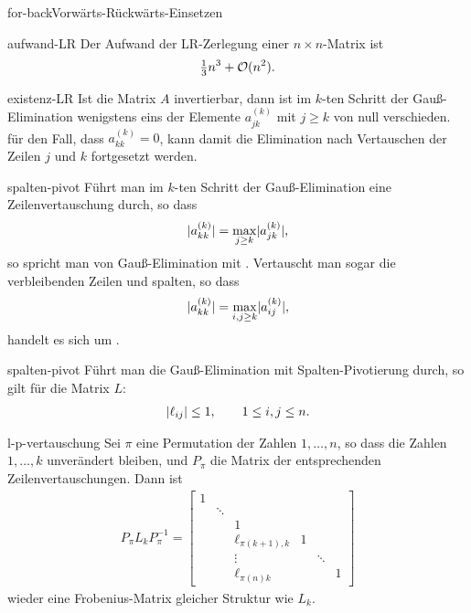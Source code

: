 \begin{Algorithmus*}{for-back}{Vorwärts-Rückwärts-Einsetzen}
  
\end{Algorithmus*}

\begin{Lemma}{aufwand-LR}
  Der Aufwand der LR-Zerlegung einer $n\times n$-Matrix ist
  \begin{gather}
    \tfrac13 n^3 + \mathcal O(n^2).
  \end{gather}
\end{Lemma}

\begin{Satz}{existenz-LR}
  Ist die Matrix $A$ invertierbar, dann ist im $k$-ten Schritt der
  Gauß-Elimination wenigstens eins der Elemente $a^{(k)}_{jk}$ mit
  $j\ge k$ von null verschieden. für den Fall, dass
  $a^{(k)}_{kk} = 0$, kann damit die Elimination nach Vertauschen der
  Zeilen $j$ und $k$ fortgesetzt werden.
\end{Satz}

\begin{Definition}{spalten-pivot}
  Führt man im $k$-ten Schritt der Gauß-Elimination eine
  Zeilenvertauschung durch, so dass
  \begin{gather}
    \lvert a^{(k)}_{kk}\rvert = \max_{j\ge k} \lvert a^{(k)}_{jk}\rvert,
  \end{gather}
  so spricht man von Gauß-Elimination mit
  . Vertauscht man sogar die verbleibenden
  Zeilen und spalten, so dass
  \begin{gather}
    \lvert a^{(k)}_{kk}\rvert = \max_{i,j\ge k} \lvert a^{(k)}_{ij}\rvert,
  \end{gather}
  handelt es sich um .
\end{Definition}

\begin{Lemma}{spalten-pivot}
  Führt man die Gauß-Elimination mit Spalten-Pivotierung durch, so gilt
  für die Matrix $L$:
  \begin{gather}
    \lvert\ell_{ij}\rvert \le 1,\qquad1\le i,j\le n.
  \end{gather}
\end{Lemma}

\begin{Lemma}{l-p-vertauschung}
  Sei $\pi$ eine Permutation der Zahlen $1,\dots,n$, so dass die
  Zahlen $1,\dots,k$ unverändert bleiben, und $P_{\pi}$ die Matrix der
  entsprechenden Zeilenvertauschungen. Dann ist
  \begin{gather}
    P_\pi L_k P_\pi^{-1} =
    \begin{bmatrix}
      1 & & & & & \\
      &\ddots & & & & \\
      &   & 1& & &\\
      &   & \ell_{\pi(k+1),k}&1 & &\\
      &   & \vdots& &\ddots &\\
      &   & \ell_{\pi(n)k}& & &1
    \end{bmatrix}
  \end{gather}
  wieder eine Frobenius-Matrix gleicher Struktur wie $L_k$.
\end{Lemma}

